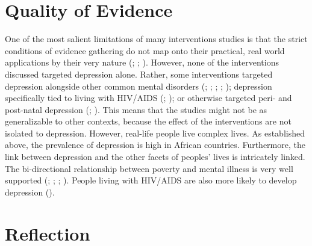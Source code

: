 \documentclass[stu,a4paper,12pt,donotrepeattitle]{apa7}
\begin{document}
\section{Quality of Evidence}
One of the most salient limitations of many interventions studies
is that the strict conditions of evidence gathering do not map onto their
practical, real world applications by their very nature (\cite{douketal21};
\cite{kaz14}; \cite{shed18}). However, none of the interventions discussed
targeted depression alone. Rather, some interventions targeted depression
alongside other common mental disorders (\cite{abasetal16}; \cite{chibandaetal11};
\cite{chibandaetal15}; \cite{chibandaetal16}; \cite{douketal21}); depression
specifically tied to living with HIV/AIDS (\cite{logetal18};
\cite{petersenetal14}); or otherwise targeted peri- and post-natal depression
(\cite{lunetal14}; \cite{nyatetal16}). This means that the studies might not be
as generalizable to other contexts, because the effect of the interventions are
not isolated to depression. However, real-life people live complex lives. As
established above, the prevalence of depression is high in African countries.
Furthermore, the link between depression and the other facets of peoples' lives
is intricately linked. The bi-directional relationship between poverty and
mental illness is very well supported (\cite{lundetal10}; \cite{lund12};
\cite{ridetal20}; \cite{wahl17}). People living with HIV/AIDS are also
more likely to develop depression (\cite{logetal18}).
\section{Reflection}
\newpage
\printbibliography
\end{document}
